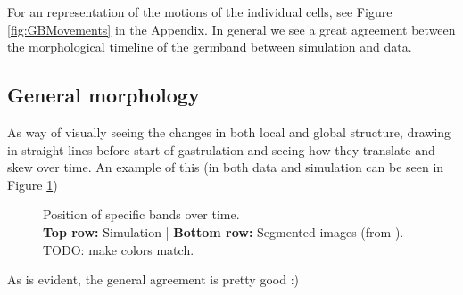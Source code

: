 For an representation of the motions of the individual cells, see Figure \ref{fig:GBMovements} in the Appendix.
In general we see a great agreement between the morphological timeline of the germband between simulation and data.


\subsection{General morphology}
As way of visually seeing the changes in both local and global structure, drawing in straight lines before start of gastrulation and seeing how they translate and skew over time. An example of this (in both data and simulation can be seen in Figure \ref{fig:band-movements-stas}) 

\begin{figure}[H]
    \centering
\end{figure}
\begin{figure}[H]
    \centering
    \caption{Position of specific bands over time.\\ \textbf{Top row:} Simulation | \textbf{Bottom row:}  Segmented images (from \cite{stern2022deconstructing}). \\TODO: make colors match.}
    \label{fig:band-movements-stas}
\end{figure}

As is evident, the general agreement is pretty good :)


